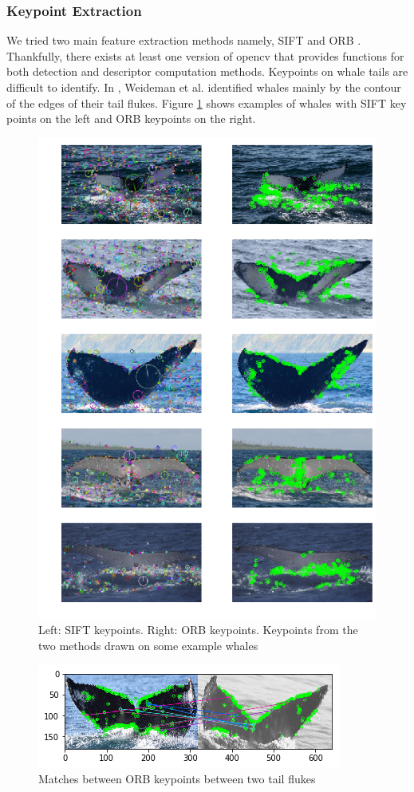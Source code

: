 \subsubsection{Keypoint Extraction}

We tried two main feature extraction methods namely, SIFT \cite{lowe2004distinctive} and ORB \cite{rublee2011orb}. Thankfully, there exists at least one version of opencv that provides functions for both detection and descriptor computation methods. Keypoints on whale tails are difficult to identify. In \cite{weideman2017integral}, Weideman et al. identified whales mainly by the contour of the edges of their tail flukes. Figure \ref{fig:whalekp} shows examples of whales with SIFT key points on the left and ORB keypoints on the right.

\begin{figure}[ht]
	\centering
	\includegraphics[width=.5\linewidth]{images/kp_side_by_side.png}
	\caption{\label{fig:whalekp}Left: SIFT keypoints. Right: ORB keypoints. Keypoints from the two methods drawn on some example whales}
\end{figure}
\begin{figure}[h]
	\centering
	\includegraphics[width=.8\linewidth]{images/orb_matches.png}
	\caption{\label{fig:orbmatch}Matches between ORB keypoints between two tail flukes}
\end{figure}

